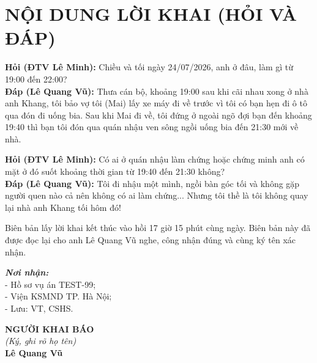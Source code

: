 \documentclass[12pt,a4paper]{article}
\begin{document}
\section*{NỘI DUNG LỜI KHAI (HỎI VÀ ĐÁP)}

\noindent \textbf{Hỏi (ĐTV Lê Minh):} Chiều và tối ngày 24/07/2026, anh ở đâu, làm gì từ 19:00 đến 22:00?\\
\textbf{Đáp (Lê Quang Vũ):} Thưa cán bộ, khoảng 19:00 sau khi cãi nhau xong ở nhà anh Khang, tôi bảo vợ tôi (Mai) lấy xe máy đi về trước vì tôi có bạn hẹn đi ô tô qua đón đi uống bia. Sau khi Mai đi về, tôi đứng ở ngoài ngõ đợi bạn đến khoảng 19:40 thì bạn tôi đón qua quán nhậu ven sông ngồi uống bia đến 21:30 mới về nhà.

\noindent \textbf{Hỏi (ĐTV Lê Minh):} Có ai ở quán nhậu làm chứng hoặc chứng minh anh có mặt ở đó suốt khoảng thời gian từ 19:40 đến 21:30 không?\\
\textbf{Đáp (Lê Quang Vũ):} Tôi đi nhậu một mình, ngồi bàn góc tối và không gặp người quen nào cả nên không có ai làm chứng... Nhưng tôi thề là tôi không quay lại nhà anh Khang tối hôm đó!

\noindent Biên bản lấy lời khai kết thúc vào hồi 17 giờ 15 phút cùng ngày. Biên bản này đã được đọc lại cho anh Lê Quang Vũ nghe, công nhận đúng và cùng ký tên xác nhận.

\vspace{0.8cm}

\noindent
\begin{minipage}[t]{0.45\textwidth}
    \small
    \textbf{\textit{Nơi nhận:}}\\
    - Hồ sơ vụ án TEST-99;\\
    - Viện KSMND TP. Hà Nội;\\
    - Lưu: VT, CSHS.
\end{minipage}
\hfill
\begin{minipage}[t]{0.5\textwidth}
    \begin{center}
        \small
        \textbf{NGƯỜI KHAI BÁO}\\
        \textit{(Ký, ghi rõ họ tên)}\\[1.5cm]
        \textbf{Lê Quang Vũ}
    \end{center}
\end{minipage}
\end{document}
